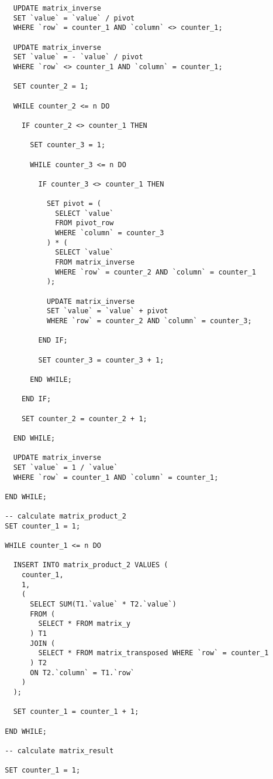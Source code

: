 \begin{verbatim}
    UPDATE matrix_inverse
    SET `value` = `value` / pivot
    WHERE `row` = counter_1 AND `column` <> counter_1;

    UPDATE matrix_inverse
    SET `value` = - `value` / pivot
    WHERE `row` <> counter_1 AND `column` = counter_1;

    SET counter_2 = 1;

    WHILE counter_2 <= n DO

      IF counter_2 <> counter_1 THEN

        SET counter_3 = 1;

        WHILE counter_3 <= n DO

          IF counter_3 <> counter_1 THEN

            SET pivot = (
              SELECT `value`
              FROM pivot_row
              WHERE `column` = counter_3
            ) * (
              SELECT `value`
              FROM matrix_inverse
              WHERE `row` = counter_2 AND `column` = counter_1
            );

            UPDATE matrix_inverse
            SET `value` = `value` + pivot
            WHERE `row` = counter_2 AND `column` = counter_3;

          END IF;

          SET counter_3 = counter_3 + 1;

        END WHILE;

      END IF;

      SET counter_2 = counter_2 + 1;

    END WHILE;

    UPDATE matrix_inverse
    SET `value` = 1 / `value`
    WHERE `row` = counter_1 AND `column` = counter_1;

  END WHILE;

  -- calculate matrix_product_2
  SET counter_1 = 1;

  WHILE counter_1 <= n DO

    INSERT INTO matrix_product_2 VALUES (
      counter_1,
      1,
      (
        SELECT SUM(T1.`value` * T2.`value`)
        FROM (
          SELECT * FROM matrix_y
        ) T1
        JOIN (
          SELECT * FROM matrix_transposed WHERE `row` = counter_1
        ) T2
        ON T2.`column` = T1.`row`
      )
    );

    SET counter_1 = counter_1 + 1;

  END WHILE;

  -- calculate matrix_result

  SET counter_1 = 1;


\end{verbatim}
